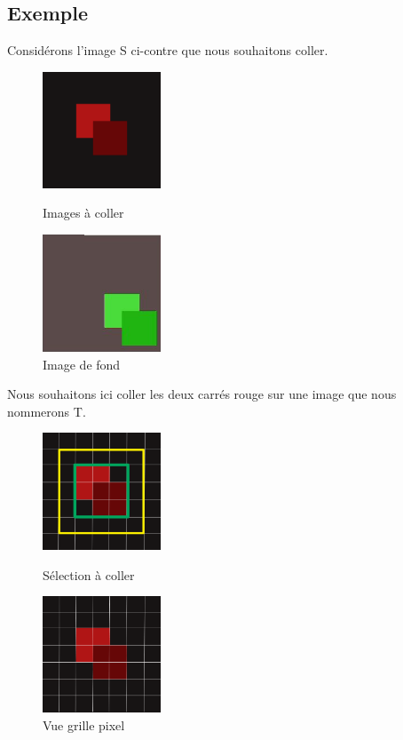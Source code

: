 \subsection{Exemple}
Considérons l'image S ci-contre que nous souhaitons coller. 
\begin{figure}[!htb]
   \begin{minipage}{0.5\textwidth}
     \centering
     \includegraphics[width = 100pt]{Images/square.png}
     \caption{Images à coller}
      \end{minipage}\hfill
   \begin{minipage}{0.5\textwidth}
     \centering
\includegraphics[width = 100pt]{Images/targer.png}
\caption{Image de fond}
      \end{minipage}\hfill
\end{figure}
Nous souhaitons ici coller les deux carrés rouge sur une image que nous nommerons T.  

\begin{figure}[!htb]
   \begin{minipage}{0.5\textwidth}
     \centering
     \includegraphics[width = 100pt]{Images/carre_selection.png}
\caption{Sélection à coller}
      \end{minipage}\hfill
         \begin{minipage}{0.5\textwidth}
     \centering
     \includegraphics[width = 100pt]{Images/pix.png}
\caption{Vue grille pixel}
      \end{minipage}\hfill
      \end{figure}
\newpage

